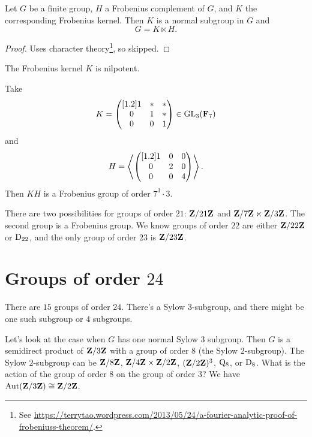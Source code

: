 \documentclass[11pt, oneside]{amsart}
\begin{document}
\begin{theorem}[Frobenius]\label{frob}
Let $G$ be a finite group, $H$ a Frobenius complement of $G$, and $K$ the corresponding Frobenius kernel. Then $K$ is a normal subgroup in $G$ and 
$$
G = K\ltimes H.
$$
\end{theorem}

\begin{proof}
Uses character theory\footnote{See \url{https://terrytao.wordpress.com/2013/05/24/a-fourier-analytic-proof-of-frobeniuss-theorem/}.}, so skipped.
\end{proof}

\begin{theorem}[Thompson]\label{thom}
The Frobenius kernel $K$ is nilpotent.
\end{theorem}
\begin{example}
Take 
$$
K = \begin{pmatrix} [ 1.2 ]  1 & * & * \\ 0 &1 &*\\ 0&0&1\end{pmatrix} \in \operatorname{GL}_3({\mathbf F_7})
$$
and 
$$
H = \left \langle \begin{pmatrix} [ 1.2 ]  1 & 0&0  \\ 0 &2 &0\\ 0&0&4\end{pmatrix}\right \rangle .
$$
Then $KH $ is a Frobenius group of order $7^3\cdot 3$.
\end{example}

There are two possibilities for groups of order $21$: $\mathbf Z/21\mathbf Z$ and $\mathbf Z/7\mathbf Z\ltimes \mathbf Z/3\mathbf Z$. The second group is a Frobenius group. We know groups of order $22$ are either $\mathbf Z/22\mathbf Z$ or $\operatorname{D}_{22}$, and the only group of order $23$ is $\mathbf Z/23\mathbf Z$.

\section{Groups of order $24$}
There are $15$ groups of order $24$. There's a Sylow $3$-subgroup, and there might be one such subgroup or $4$ subgroups. 

Let's look at the case when $G$ has one normal Sylow $3$ subgroup. Then $G$ is a semidirect product of $\mathbf Z / 3\mathbf Z$ with a group of order $8$ (the Sylow $2$-subgroup). The Sylow $2$-subgroup can be $\mathbf Z / 8\mathbf Z$, $\mathbf Z / 4\mathbf Z\times \mathbf Z / 2\mathbf Z$, $(\mathbf Z / 2\mathbf Z)^3$, $\operatorname{Q_8}$, or $\operatorname{D}_8$. What is the action of the group of order $8$ on the group of order $3$? We have $\operatorname{Aut}(\mathbf Z / 3\mathbf Z) \cong \mathbf Z / 2\mathbf Z$. 
\end{document}
